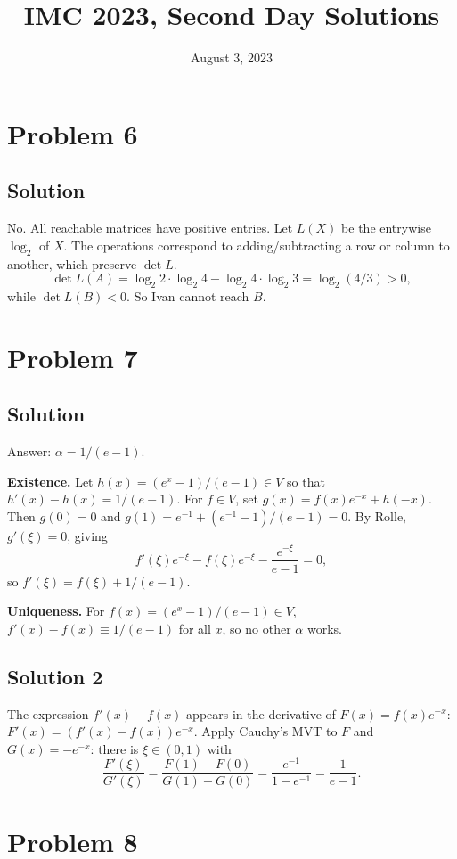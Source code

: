 \documentclass{article}
\title{IMC 2023, Second Day Solutions}
\date{August 3, 2023}
\begin{document}
\maketitle

\section*{Problem 6}
\subsection*{Solution}
No. All reachable matrices have positive entries. Let $L(X)$ be the entrywise $\log_2$ of $X$. The operations correspond to adding/subtracting a row or column to another, which preserve $\det L$.
\[ \det L(A) = \log_2 2 \cdot \log_2 4 - \log_2 4 \cdot \log_2 3 = \log_2(4/3) > 0, \]
while $\det L(B) < 0$. So Ivan cannot reach $B$.

\section*{Problem 7}
\subsection*{Solution}
Answer: $\alpha = 1/(e-1)$.

\textbf{Existence.} Let $h(x) = (e^x - 1)/(e-1) \in V$ so that $h'(x) - h(x) = 1/(e-1)$. For $f \in V$, set $g(x) = f(x) e^{-x} + h(-x)$. Then $g(0) = 0$ and $g(1) = e^{-1} + (e^{-1}-1)/(e-1) = 0$. By Rolle, $g'(\xi) = 0$, giving
\[ f'(\xi) e^{-\xi} - f(\xi) e^{-\xi} - \frac{e^{-\xi}}{e-1} = 0, \]
so $f'(\xi) = f(\xi) + 1/(e-1)$.

\textbf{Uniqueness.} For $f(x) = (e^x - 1)/(e-1) \in V$, $f'(x) - f(x) \equiv 1/(e-1)$ for all $x$, so no other $\alpha$ works.

\subsection*{Solution 2}
The expression $f'(x) - f(x)$ appears in the derivative of $F(x) = f(x) e^{-x}$: $F'(x) = (f'(x) - f(x)) e^{-x}$. Apply Cauchy's MVT to $F$ and $G(x) = -e^{-x}$: there is $\xi \in (0,1)$ with
\[ \frac{F'(\xi)}{G'(\xi)} = \frac{F(1) - F(0)}{G(1) - G(0)} = \frac{e^{-1}}{1 - e^{-1}} = \frac{1}{e-1}. \]

\section*{Problem 8}
\end{document}
